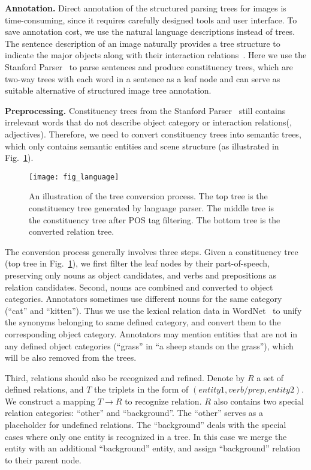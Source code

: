\documentclass[10pt,twocolumn,letterpaper]{article}
\begin{document}
\textbf{Annotation.}
Direct annotation of the structured parsing trees for images is time-consuming, since it requires carefully designed tools and user interface. To save annotation cost, we use the natural language descriptions instead of trees. The sentence description of an image naturally provides a tree structure to indicate the major objects along with their interaction relations~\cite{DBLP:journals/ml/Elman91}. Here we use the Stanford Parser~\cite{DBLP:conf/acl/SocherBMN13} to parse sentences and produce constituency trees, which are two-way trees with each word in a sentence as a leaf node and can serve as suitable alternative of structured image tree annotation.

\textbf{Preprocessing.}
Constituency trees from the Stanford Parser~\cite{DBLP:conf/acl/SocherBMN13} still contains irrelevant words that do not describe object category or interaction relations(\eg, adjectives). Therefore, we need to convert constituency trees into semantic trees, which only contains semantic entities and scene structure (as illustrated in Fig.~\ref{fig:language}).

\begin{figure}[t]
\centering
\texttt{[image: fig\_language]}
\caption{An illustration of the tree conversion process. The top tree is the constituency tree generated by language parser. The middle tree is the constituency tree after POS tag filtering. The bottom tree is the converted relation tree.}
\label{fig:language}
\end{figure}

The conversion process generally involves three steps. Given a constituency tree (top tree in Fig.~\ref{fig:language}), we first filter the leaf nodes by their part-of-speech, preserving only nouns as object candidates, and verbs and prepositions as relation candidates. Second, nouns are combined and converted to object categories. Annotators sometimes use different nouns for the same category (\eg ``cat'' and ``kitten''). Thus we use the lexical relation data in WordNet~\cite{wordnet} to unify the synonyms belonging to same defined category, and convert them to the corresponding object category. Annotators may mention entities that are not in any defined object categories (\eg ``grass'' in ``a sheep stands on the grass''), which will be also removed from the trees.

Third, relations should also be recognized and refined. Denote by $R$ a set of defined relations, and $T$ the triplets in the form of $(entity1, verb/prep, entity2)$. We construct a mapping $T \rightarrow R$ to recognize relation. $R$ also contains two special relation categories: ``other'' and ``background''. The ``other'' serves as a placeholder for undefined relations. The ``background'' deals with the special cases where only one entity is recognized in a tree. In this case we merge the entity with an additional ``background'' entity, and assign ``background'' relation to their parent node.
\end{document}
